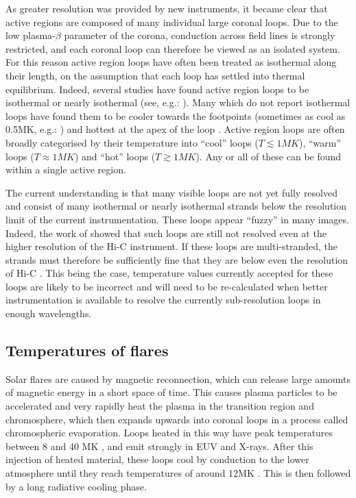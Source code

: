 \documentclass[namedreferences]{solarphysics}
\begin{document}
As greater resolution was provided by new instruments, it became clear that active regions are composed of many individual large coronal loops.
Due to the low plasma-$\beta$ parameter of the corona, conduction across field lines is strongly restricted, and each coronal loop can therefore be viewed as an isolated system.
For this reason active region loops have often been treated as isothermal along their length, on the assumption that each loop has settled into thermal equilibrium.
Indeed, several studies have found active region loops to be isothermal or nearly isothermal (see, e.g.: \citet{Lenz1999,DelZanna2011,DelZanna2013}).
Many which do not report isothermal loops have found them to be cooler towards the footpoints (sometimes as cool as 0.5MK, e.g.: \citet{DelZanna2011}) and hottest at the apex of the loop \citep{Cheng1980,Aschwanden2000,DelZanna2003}.
Active region loops are often broadly categorised by their temperature into ``cool'' loops ($T\lesssim1MK$), ``warm'' loops ($T\approx1MK$) and ``hot'' loops ($T\gtrsim1MK$).
Any or all of these can be found within a single active region.

The current understanding is that many visible loops are not yet fully resolved and consist of many isothermal or nearly isothermal strands below the resolution limit of the current instrumentation.
These loops appear ``fuzzy'' in many images.
Indeed, the work of \citet{DelZanna2013} showed that such loops are still not resolved even at the higher resolution of the Hi-C instrument.
If these loops are multi-stranded, the strands must therefore be sufficiently fine that they are below even the resolution of Hi-C \citep{Cirtain2013}.
This being the case, temperature values currently accepted for these loops are likely to be incorrect and will need to be re-calculated when better instrumentation is available to resolve the currently sub-resolution loops in enough wavelengths.

\subsection{Temperatures of flares}
Solar flares are caused by magnetic reconnection, which can release large amounts of magnetic energy in a short space of time.
This causes plasma particles to be accelerated and very rapidly heat the plasma in the transition region and chromosphere, which then expands upwards into coronal loops \citep{Simoes2015} in a process called chromospheric evaporation.
Loops heated in this way have peak temperatures between 8 and 40 MK \citep{Ryan2013,Ryan2014}, and emit strongly in EUV and X-rays.
After this injection of heated material, these loops cool by conduction to the lower atmosphere until they reach temperatures of around 12MK \citep{Aschwanden2005}.
This is then followed by a long radiative cooling phase.
\end{document}
